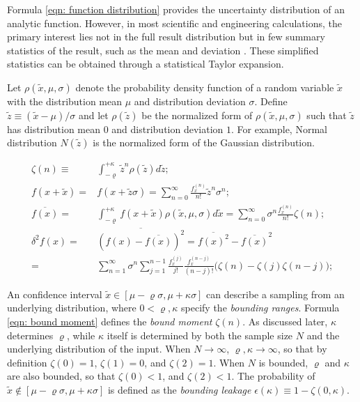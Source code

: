 \documentclass[twoside]{article}
\numberwithin{equation}{section}
\begin{document}
Formula \eqref{eqn: function distribution} provides the uncertainty distribution of an analytic function.
However, in most scientific and engineering calculations, the primary interest lies not in the full result distribution but in few summary statistics of the result, such as the mean and deviation \cite{Statistical_Methods}\cite{Precisions_Physical_Measurements}.
These simplified statistics can be obtained through a statistical Taylor expansion.

Let $\rho(\tilde{x}, \mu, \sigma)$ denote the probability density function of a random variable $\tilde{x}$ with the distribution mean $\mu$ and distribution deviation $\sigma$.
Define $\tilde{z} \equiv (\tilde{x} - \mu)/\sigma$ and let $\rho(\tilde{z})$ be the normalized form of $\rho(\tilde{x}, \mu, \sigma)$ such that $\tilde{z}$ has distribution mean $0$ and distribution deviation $1$.
For example, Normal distribution $N(\tilde{z})$ is the normalized form of the Gaussian distribution.

\begin{align}
\label{eqn: bound moment}
\zeta(n) \equiv& \int_{-\varrho}^{+\kappa} \tilde{z}^n \rho(\tilde{z}) d \tilde{z};\\
\label{eqn: Taylor 1d} 
f(x + \tilde{x}) =& f(x + \tilde{z} \sigma) = \sum_{n=0}^{\infty} \frac{f^{(n)}_x}{n!} \tilde{z}^n \sigma^n; \\
\label{eqn: Taylor 1d mean}
\overline{f(x)} =& \int_{-\varrho}^{+\kappa} f(x + \tilde{x}) \rho(\tilde{x}, \mu, \sigma) d \tilde{x}
  = \sum_{n=0}^{\infty}\sigma^n \frac{f^{(n)}_x}{n!} \zeta(n); \\
\label{eqn: Taylor 1d variance}
\delta^2 f(x) =& \overline{(f(x) - \overline{f(x)})^2} = \overline{f(x)^2} - \overline{f(x)}^2 \nonumber \\
	=& \sum_{n=1}^{\infty} \sigma^n \sum_{j=1}^{n-1} \frac{f^{(j)}_x}{j!} \frac{f^{(n-j)}_x}{(n-j)!} \big(\zeta(n) - \zeta(j) \zeta(n -j) \big);  
\end{align}

An confidence interval \cite{Probability_Statistics} $\tilde{x} \in [\mu - \varrho \sigma, \mu + \kappa \sigma]$ can describe a sampling from an underlying distribution, where $0 < \varrho, \kappa$ specify the \emph{bounding ranges}. 
Formula \eqref{eqn: bound moment} defines the \emph{bound moment} $\zeta(n)$.
As discussed later, $\kappa$ determines $\varrho$, while $\kappa$ itself is determined by both the sample size $N$ and the underlying distribution of the input.
When $N \rightarrow \infty$, $\varrho, \kappa \rightarrow \infty$, so that by definition $\zeta(0) = 1$, $\zeta(1) = 0$, and $\zeta(2) = 1$.
When $N$ is bounded, $\varrho$ and $\kappa$ are also bounded, so that $\zeta(0) < 1$, and $\zeta(2) < 1$.
The probability of $\tilde{x} \not \in [\mu - \varrho \sigma, \mu + \kappa \sigma]$ is defined as the \emph{bounding leakage} $\epsilon(\kappa) \equiv 1 - \zeta(0, \kappa)$.
\end{document}
